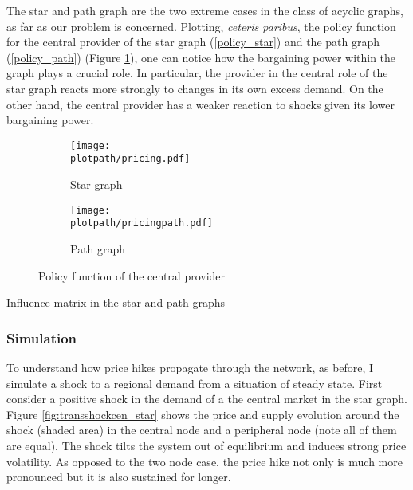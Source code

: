 The star and path graph are the two extreme cases in the class of acyclic graphs, as far as our problem is concerned. Plotting, \textit{ceteris paribus}, the policy function for the central provider of the star graph (\ref{policy_star}) and the path graph (\ref{policy_path}) (Figure \ref{fig:p}), one can notice how the bargaining power within the graph plays a crucial role. In particular, the provider in the central role of the star graph reacts more strongly to changes in its own excess demand. On the other hand, the central provider has a weaker reaction to shocks given its lower bargaining power.

\begin{center}
  \begin{figure}[H]
    \begin{subfigure}{0.475\textwidth}
      \centering
      \texttt{[image: \\plotpath/pricing.pdf]}
      \caption{Star graph}
    \end{subfigure}
    \hfill
    \begin{subfigure}{0.475\textwidth}
      \centering
      \texttt{[image: \\plotpath/pricingpath.pdf]}
      \caption{Path graph}
    \end{subfigure}
    \caption{Policy function of the central provider}
    \label{fig:p}
  \end{figure}


  \begin{table}[H]
    \centering
    
    \caption{Influence matrix in the star and path graphs}
    \label{table:influence}
  \end{table}
\end{center}
\subsubsection{Simulation}

To understand how price hikes propagate through the network, as before, I simulate a shock to a regional demand from a situation of steady state. First consider a positive shock in the demand of a the central market in the star graph. Figure \ref{fig:transshockcen_star} shows the price and supply evolution around the shock (shaded area) in the central node and a peripheral node (note all of them are equal). The shock tilts the system out of equilibrium and induces strong price volatility. As opposed to the two node case, the price hike not only is much more pronounced but it is also sustained for longer.

